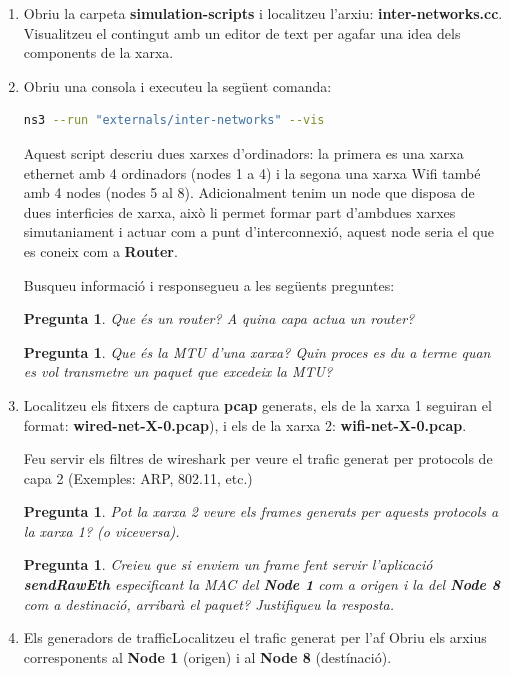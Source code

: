 \documentclass[12pt,a4paper]{article}
\newcounter{exercises}
\newtheorem{exer}[exercises]{Pregunta}
\begin{document}
\begin{enumerate} 
 \item Obriu la carpeta \textbf{simulation-scripts} i localitzeu l'arxiu: \textbf{inter-networks.cc}. Visualitzeu el contingut amb un editor de text per agafar una idea dels components de la xarxa.
  
\item Obriu una consola i executeu la següent comanda:
\begin{lstlisting}[language=bash]
   ns3 --run "externals/inter-networks" --vis
\end{lstlisting}

Aquest script descriu dues xarxes d'ordinadors: la primera es una xarxa ethernet amb 4 ordinadors (nodes 1 a 4) i la segona una xarxa Wifi també amb 4 nodes (nodes 5 al 8). 
Adicionalment tenim un node que disposa de dues interficies de xarxa, això li permet formar part d'ambdues xarxes simutaniament i actuar com a punt d'interconnexió,
aquest node seria el que es coneix com a \textbf{Router}.

Busqueu informació i responsegueu a les següents preguntes:
\begin{exer} Que és un router? A quina capa actua un router?  \end{exer}
\begin{exer} Que és la MTU d'una xarxa? Quin proces es du a terme quan es vol transmetre un paquet
que excedeix la MTU?\end{exer}

\item Localitzeu els fitxers de captura \textbf{pcap} generats, els de la xarxa 1 seguiran el format: \textbf{wired-net-X-0.pcap}),
i els de la xarxa 2: \textbf{wifi-net-X-0.pcap}.

Feu servir els filtres de wireshark per veure el trafic generat per protocols de capa 2 (Exemples: ARP, 802.11, etc.)
\begin{exer}
 Pot la xarxa 2 veure els frames generats per aquests protocols a la xarxa 1? (o viceversa).
\end{exer}
\begin{exer}
 Creieu que si enviem un frame fent servir l'aplicació \textbf{sendRawEth} especificant la MAC del \textbf{Node 1} com a origen
 i la del \textbf{Node 8} com a destinació, arribarà el paquet? Justifiqueu la resposta.
\end{exer}


\item Els generadors de trafficLocalitzeu el trafic generat per l'af
Obriu els arxius corresponents al \textbf{Node 1} (origen) i al \textbf{Node 8} (destínació).

\end{enumerate}
\end{document}
